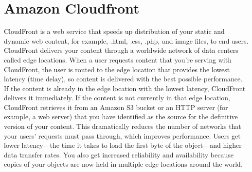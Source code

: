 \section{Amazon Cloudfront}
\label{sec:Amazon Cloudfront}

CloudFront is a web service that speeds up distribution of your static and dynamic web content, for example, .html, .css, .php, and image files, to end users. CloudFront delivers your content through a worldwide network of data centers called edge locations. When a user requests content that you're serving with CloudFront, the user is routed to the edge location that provides the lowest latency (time delay), so content is delivered with the best possible performance. If the content is already in the edge location with the lowest latency, CloudFront delivers it immediately. If the content is not currently in that edge location, CloudFront retrieves it from an Amazon S3 bucket or an HTTP server (for example, a web server) that you have identified as the source for the definitive version of your content.
This dramatically reduces the number of networks that your users' requests must pass through, which improves performance. Users get lower latency—the time it takes to load the first byte of the object—and higher data transfer rates. You also get increased reliability and availability because copies of your objects are now held in multiple edge locations around the world.




